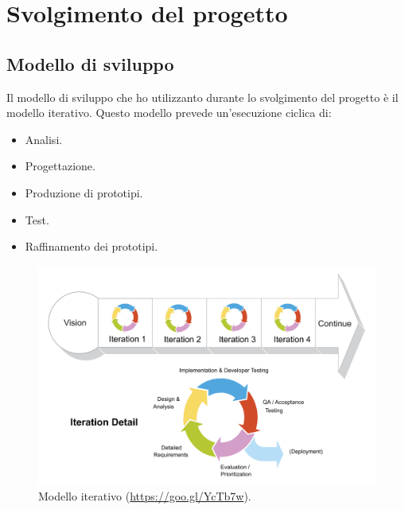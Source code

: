 
\chapter{Svolgimento del progetto}
\section{Modello di sviluppo}
	
	Il modello di sviluppo che ho utilizzanto durante lo svolgimento del progetto è il modello iterativo. Questo modello prevede un'esecuzione ciclica di:
	\begin{itemize}
		\item Analisi.
		\item Progettazione.
		\item Produzione di prototipi.
		\item Test.
		\item Raffinamento dei prototipi.
	\end{itemize}
	
	\begin{figure}[H]
		\centering
		\includegraphics[scale=0.35]{immagini/modello-iterativo}
		\caption{Modello iterativo (\url{https://goo.gl/YcTb7w}).}
	\end{figure}

	
